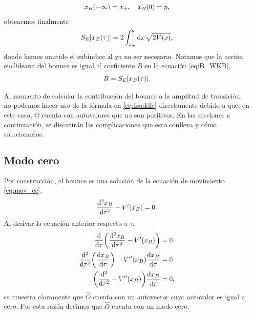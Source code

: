 \begin{equation}
x_B\qty(-\infty) = x_+, \quad x_B\qty(0) = p,
\end{equation}
obtenemos finalmente
\begin{equation}\label{eq:bounce4}
S_E\qty[x_B\qty(\tau)] = 2 \int_{x_+}^{p} \dd{x} \sqrt{2 V\qty(x)},
\end{equation}
donde hemos omitido el subíndice al ya no ser necesario. Notamos que la acción euclideana del bounce es igual al coeficiente $B$ en la ecuación \eqref{eq:B_WKB}, 
\begin{equation}
	B = S_E\qty[x_B\qty(\tau)].
\end{equation}

 
Al momento de calcular la contribución del bounce a la amplitud de transición, no podemos hacer uso de la fórmula en \eqref{eq:Isaddle} directamente debido a que, en este caso, $\hat{O}$ cuenta con autovalores que no son positivos. En las secciones a continuación, se discutirán las complicaciones que esto conlleva y cómo solucionarlas. 

\subsection{Modo cero} \label{sec:modo_zero}

Por construcción, el bounce es una solución de la ecuación de movimiento \eqref{eq:mov_ec},
\begin{equation}\label{eq:mov_ec_bounce}
\dv[2]{x_B}{\tau} - V' \qty(x_B) = 0.
\end{equation}
Al derivar la ecuación anterior respecto a $\tau$,
\begin{align}
	\dv{\tau}\qty(\dv[2]{x_B}{\tau} - V'\qty(x_B)) &= 0 \\
	\dv[2]{\tau}\qty(\dv{x_B}{\tau}) - V''\qty(x_B)\dv{x_B}{\tau} &= 0 \\
	\qty(\dv[2]{\tau} - V''\qty(x_B))\dv{x_B}{\tau} &= 0, \label{eq:eom_modo_cero}
\end{align}
se muestra claramente que $\hat{O}$ cuenta con un autovector cuyo autovalor es igual a cero. Por esta razón decimos que $\hat{O}$ cuenta con un modo cero.

